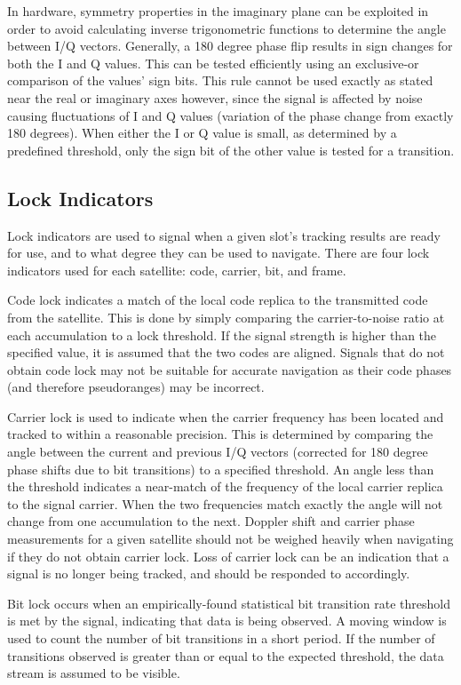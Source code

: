 \documentclass[12pt]{article}
\begin{document}
In hardware, symmetry properties in the imaginary plane can be exploited in order to avoid calculating inverse trigonometric functions to determine the angle between I/Q vectors. Generally, a 180 degree phase flip results in sign changes for both the I and Q values. This can be tested efficiently using an exclusive-or comparison of the values' sign bits. This rule cannot be used exactly as stated near the real or imaginary axes however, since the signal is affected by noise causing fluctuations of I and Q values (variation of the phase change from exactly 180 degrees). When either the I or Q value is small, as determined by a predefined threshold, only the sign bit of the other value is tested for a transition.

\subsection{Lock Indicators}
Lock indicators are used to signal when a given slot's tracking results are ready for use, and to what degree they can be used to navigate. There are four lock indicators used for each satellite: code, carrier, bit, and frame.

Code lock indicates a match of the local code replica to the transmitted code from the satellite. This is done by simply comparing the carrier-to-noise ratio at each accumulation to a lock threshold. If the signal strength is higher than the specified value, it is assumed that the two codes are aligned. Signals that do not obtain code lock may not be suitable for accurate navigation as their code phases (and therefore pseudoranges) may be incorrect.

Carrier lock is used to indicate when the carrier frequency has been located and tracked to within a reasonable precision. This is determined by comparing the angle between the current and previous I/Q vectors (corrected for 180 degree phase shifts due to bit transitions) to a specified threshold. An angle less than the threshold indicates a near-match of the frequency of the local carrier replica to the signal carrier. When the two frequencies match exactly the angle will not change from one accumulation to the next. Doppler shift and carrier phase measurements for a given satellite should not be weighed heavily when navigating if they do not obtain carrier lock. Loss of carrier lock can be an indication that a signal is no longer being tracked, and should be responded to accordingly.

Bit lock occurs when an empirically-found statistical bit transition rate threshold is met by the signal, indicating that data is being observed. A moving window is used to count the number of bit transitions in a short period. If the number of transitions observed is greater than or equal to the expected threshold, the data stream is assumed to be visible.
\end{document}
